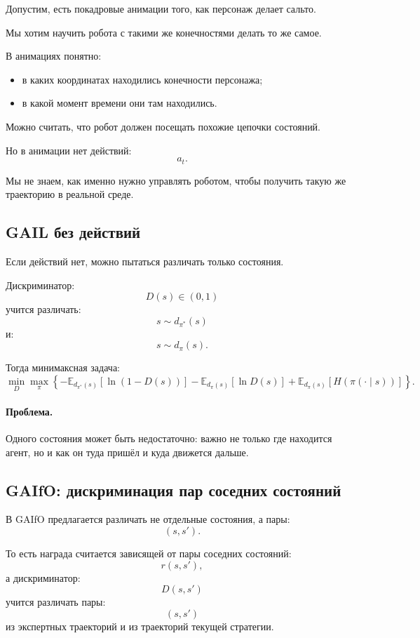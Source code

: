 \documentclass[12pt,a4paper]{article}
\begin{document}
Допустим, есть покадровые анимации того, как персонаж делает сальто.

Мы хотим научить робота с такими же конечностями делать то же самое.

В анимациях понятно:
\begin{itemize}
    \item в каких координатах находились конечности персонажа;
    \item в какой момент времени они там находились.
\end{itemize}

Можно считать, что робот должен посещать похожие цепочки состояний.

Но в анимации нет действий:
\[
a_t.
\]

Мы не знаем, как именно нужно управлять роботом, чтобы получить такую же траекторию в реальной среде.

\subsection{GAIL без действий}

Если действий нет, можно пытаться различать только состояния.

Дискриминатор:
\[
D(s)\in(0,1)
\]
учится различать:
\[
s\sim d_{\pi^\ast}(s)
\]
и:
\[
s\sim d_\pi(s).
\]

Тогда минимаксная задача:
\[
\min_D
\max_\pi
\left\{
-
\mathbb E_{d_{\pi^\ast}(s)}
\left[
\ln(1-D(s))
\right]
-
\mathbb E_{d_\pi(s)}
\left[
\ln D(s)
\right]
+
\mathbb E_{d_\pi(s)}
\left[
H(\pi(\cdot\mid s))
\right]
\right\}.
\]

\paragraph{Проблема.}

Одного состояния может быть недостаточно: важно не только где находится агент, но и как он туда пришёл и куда движется дальше.

\subsection{GAIfO: дискриминация пар соседних состояний}

В GAIfO предлагается различать не отдельные состояния, а пары:
\[
(s,s').
\]

То есть награда считается зависящей от пары соседних состояний:
\[
r(s,s'),
\]
а дискриминатор:
\[
D(s,s')
\]
учится различать пары:
\[
(s,s')
\]
из экспертных траекторий и из траекторий текущей стратегии.
\end{document}
